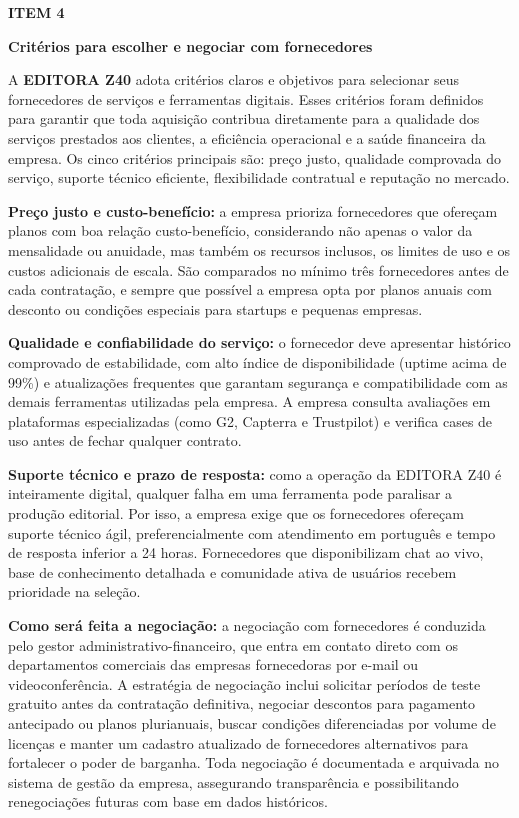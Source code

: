 \documentclass[10pt,a4paper]{article}
\newcommand{\labelfont}{\fontsize{5.8}{7.5}\selectfont\bfseries\addfontfeatures{LetterSpace=15}}
\newcommand{\headingfont}{\fontsize{9.8}{12}\selectfont\bfseries\color{navy}}
\newcommand{\separador}{\vspace{16pt}{\color{rulegray}\rule{\linewidth}{0.6pt}}\vspace{10pt}}
\newcommand{\itemh}[2]{\needspace{6\baselineskip}%
  {\labelfont\color{graylab}ITEM #1}\par\vspace{5pt}%
  {\headingfont #2}\par\vspace{8pt}}
\begin{document}
\separador
\itemh{4}{Critérios para escolher e negociar com fornecedores}

A \textbf{EDITORA Z40} adota critérios claros e objetivos para selecionar seus fornecedores de serviços e ferramentas digitais. Esses critérios foram definidos para garantir que toda aquisição contribua diretamente para a qualidade dos serviços prestados aos clientes, a eficiência operacional e a saúde financeira da empresa. Os cinco critérios principais são: preço justo, qualidade comprovada do serviço, suporte técnico eficiente, flexibilidade contratual e reputação no mercado.

\textbf{Preço justo e custo-benefício:} a empresa prioriza fornecedores que ofereçam planos com boa relação custo-benefício, considerando não apenas o valor da mensalidade ou anuidade, mas também os recursos inclusos, os limites de uso e os custos adicionais de escala. São comparados no mínimo três fornecedores antes de cada contratação, e sempre que possível a empresa opta por planos anuais com desconto ou condições especiais para startups e pequenas empresas.

\textbf{Qualidade e confiabilidade do serviço:} o fornecedor deve apresentar histórico comprovado de estabilidade, com alto índice de disponibilidade (uptime acima de 99\%) e atualizações frequentes que garantam segurança e compatibilidade com as demais ferramentas utilizadas pela empresa. A empresa consulta avaliações em plataformas especializadas (como G2, Capterra e Trustpilot) e verifica cases de uso antes de fechar qualquer contrato.

\textbf{Suporte técnico e prazo de resposta:} como a operação da EDITORA Z40 é inteiramente digital, qualquer falha em uma ferramenta pode paralisar a produção editorial. Por isso, a empresa exige que os fornecedores ofereçam suporte técnico ágil, preferencialmente com atendimento em português e tempo de resposta inferior a 24 horas. Fornecedores que disponibilizam chat ao vivo, base de conhecimento detalhada e comunidade ativa de usuários recebem prioridade na seleção.

\textbf{Como será feita a negociação:} a negociação com fornecedores é conduzida pelo gestor administrativo-financeiro, que entra em contato direto com os departamentos comerciais das empresas fornecedoras por e-mail ou videoconferência. A estratégia de negociação inclui solicitar períodos de teste gratuito antes da contratação definitiva, negociar descontos para pagamento antecipado ou planos plurianuais, buscar condições diferenciadas por volume de licenças e manter um cadastro atualizado de fornecedores alternativos para fortalecer o poder de barganha. Toda negociação é documentada e arquivada no sistema de gestão da empresa, assegurando transparência e possibilitando renegociações futuras com base em dados históricos.
\end{document}
